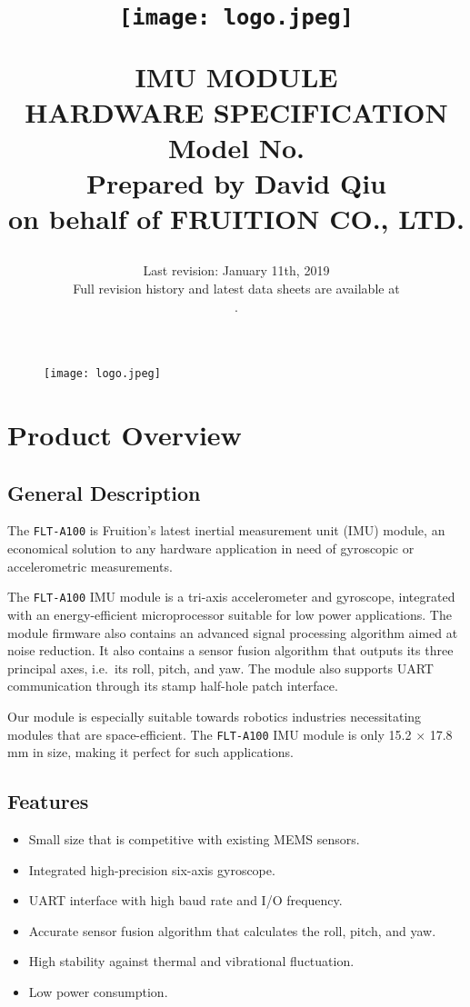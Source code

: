 \documentclass{scrreprt}
\title{
	\begin{figure}[H]
		\centering\texttt{[image: logo.jpeg]}
	\end{figure}
	\vspace{1cm}
	\flushright
	\Huge{IMU MODULE}\\
	\Huge{HARDWARE SPECIFICATION}\\
	\vspace{2cm}
	\huge{Model No. \modelno}\\
	\vspace{2cm}
	\LARGE{Prepared by David Qiu \\ on behalf of FRUITION CO., LTD.}
}
\date{
	Last revision: January 11th, 2019\\
	\vspace{0.5cm}
	Full revision history and latest data sheets are available at\\
	\vspace{0.25cm}
	\upstream.
}
\newcommand{\pchapter}[1]{
	\begingroup\let\clearpage\relax
	\newpage
	\begin{figure}[H]
		\texttt{[image: logo.jpeg]}
	\end{figure}
	\chapter{#1}
	\endgroup
}
\newcommand{\modelno}{%
	\texttt{FLT-A100}
}
\newcommand{\x}{
	$\times$
}
\begin{document}
\begin{CJK*}{UTF8}{gbsn}
\maketitle
\tableofcontents

\pchapter{Product Overview}
\section{General Description}
The \modelno is Fruition's latest inertial measurement unit (IMU) module, an
economical solution to any hardware application in need of gyroscopic or
accelerometric measurements.

The \modelno IMU module is a tri-axis accelerometer and gyroscope, integrated
with an energy-efficient microprocessor suitable for low power applications. The
module firmware also contains an advanced signal processing algorithm aimed at
noise reduction. It also contains a sensor fusion algorithm that outputs its
three principal axes, i.e.\ its roll, pitch, and yaw. The module also supports
UART communication through its stamp half-hole patch interface.

Our module is especially suitable towards robotics industries necessitating
modules that are space-efficient. The \modelno IMU module is only
15.2\x17.8 mm in size, making it perfect for such applications.

\section{Features}
\begin{itemize}
\item Small size that is competitive with existing MEMS sensors.

\item Integrated high-precision six-axis gyroscope.

\item UART interface with high baud rate and I/O frequency.

\item Accurate sensor fusion algorithm that calculates the roll, pitch, and yaw.

\item High stability against thermal and vibrational fluctuation.

\item Low power consumption.
\end{itemize}


\end{CJK*}
\end{document}
